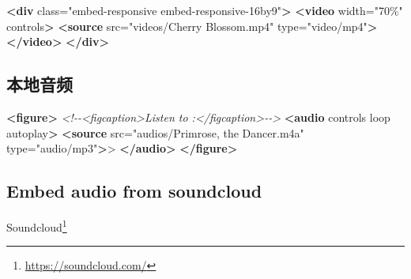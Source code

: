 \documentclass[]{ctexbook}
\newenvironment{Shaded}{\begin{snugshade}}{\end{snugshade}}
\newcommand{\CommentTok}[1]{\textcolor[rgb]{0.56,0.35,0.01}{\textit{#1}}}
\newcommand{\KeywordTok}[1]{\textcolor[rgb]{0.13,0.29,0.53}{\textbf{#1}}}
\newcommand{\NormalTok}[1]{#1}
\newcommand{\OtherTok}[1]{\textcolor[rgb]{0.56,0.35,0.01}{#1}}
\newcommand{\StringTok}[1]{\textcolor[rgb]{0.31,0.60,0.02}{#1}}
\renewcommand{\href}[2]{#2\footnote{\url{#1}}}
\begin{document}
\begin{Shaded}
\begin{Highlighting}[]
\KeywordTok{\textless{}div}\OtherTok{ class=}\StringTok{"embed{-}responsive embed{-}responsive{-}16by9"}\KeywordTok{\textgreater{}}
\KeywordTok{\textless{}video}\OtherTok{ width=}\StringTok{"70\%"}\OtherTok{ controls}\KeywordTok{\textgreater{}}
  \KeywordTok{\textless{}source}\OtherTok{ src=}\StringTok{"videos/Cherry Blossom.mp4"}\OtherTok{ type=}\StringTok{"video/mp4"}\KeywordTok{\textgreater{}}
\KeywordTok{\textless{}/video\textgreater{}}
\KeywordTok{\textless{}/div\textgreater{}}
\end{Highlighting}
\end{Shaded}

\hypertarget{ux672cux5730ux97f3ux9891}{%
\subsection{本地音频}\label{ux672cux5730ux97f3ux9891}}

\begin{Shaded}
\begin{Highlighting}[]
\KeywordTok{\textless{}figure\textgreater{}}
    \CommentTok{\textless{}!{-}{-}\textless{}figcaption\textgreater{}Listen to :\textless{}/figcaption\textgreater{}{-}{-}\textgreater{}}
    \KeywordTok{\textless{}audio}\OtherTok{ controls loop autoplay}\KeywordTok{\textgreater{}}
        \KeywordTok{\textless{}source}\OtherTok{ src=}\StringTok{"audios/Primrose, the Dancer.m4a"}\OtherTok{  type=}\StringTok{"audio/mp3"}\KeywordTok{\textgreater{}}\NormalTok{\textgreater{}}
    \KeywordTok{\textless{}/audio\textgreater{}}
\KeywordTok{\textless{}/figure\textgreater{}}   
\end{Highlighting}
\end{Shaded}

\begin{quote}
\end{quote}

\hypertarget{embed-audio-from-soundcloud}{%
\subsection{Embed audio from soundcloud}\label{embed-audio-from-soundcloud}}

\href{https://soundcloud.com/}{Soundcloud}
\end{document}
